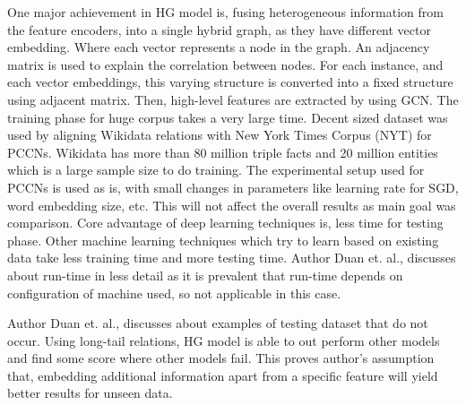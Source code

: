 \newpar
One major achievement in HG model is, fusing heterogeneous information from the feature encoders, into a single hybrid graph, as they have different vector embedding. Where each vector represents a node in the graph. An adjacency matrix is used to explain the correlation between nodes. For each instance, and each vector embeddings, this varying structure is converted into a fixed structure using adjacent matrix. Then, high-level features are extracted by using GCN. The training phase for huge corpus takes a very large time. Decent sized dataset was used by aligning Wikidata relations with New York Times Corpus (NYT) for PCCNs\cite{zeng2016incorporating}. Wikidata has more than 80 million triple facts and 20 million entities which is a large sample size to do training. The experimental setup used for PCCNs is used as is, with small changes in parameters like learning rate for SGD, word embedding size, etc. This will not affect the overall results as main goal was comparison. Core advantage of deep learning techniques is, less time for testing phase. Other machine learning techniques which try to learn based on existing data take less training time and more testing time. Author Duan et. al.,\cite{duan2019hybrid} discusses about run-time in less detail as it is prevalent that run-time depends on configuration of machine used, so not applicable in this case. 

\newpar
Author Duan et. al.,\cite{duan2019hybrid} discusses about examples of testing dataset that do not occur. Using long-tail relations, HG model is able to out perform other models and find some score where other models fail. This proves author's assumption that, embedding additional information apart from a specific feature will yield better results for unseen data. 
